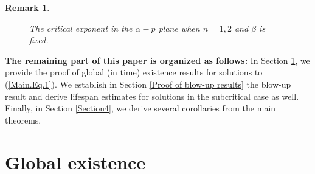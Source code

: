 \documentclass[11pt,reqno]{amsart}
\newtheorem{remark}{Remark}[section]
\begin{document}
\begin{remark}
\begin{figure}[htbp]
\begin{minipage}[b]{0.49\textwidth}
        \caption{The critical exponent in the $\alpha-p$ plane when $n =1,2$ and $\beta$ is fixed.}
        \label{fig.zone2}
    \end{minipage}
\end{figure}


\end{remark}

\textbf{The remaining part of this paper is organized as follows:} In Section \ref{section3}, we provide the proof of global (in time) existence results for solutions to (\ref{Main.Eq.1}). We establish in Section \ref{Proof of blow-up results} the blow-up result and derive lifespan estimates for
solutions in the subcritical case as well. Finally, in Section \ref{Section4}, we derive several corollaries from the main theorems.

\section{ Global existence}\label{section3}
\end{document}
